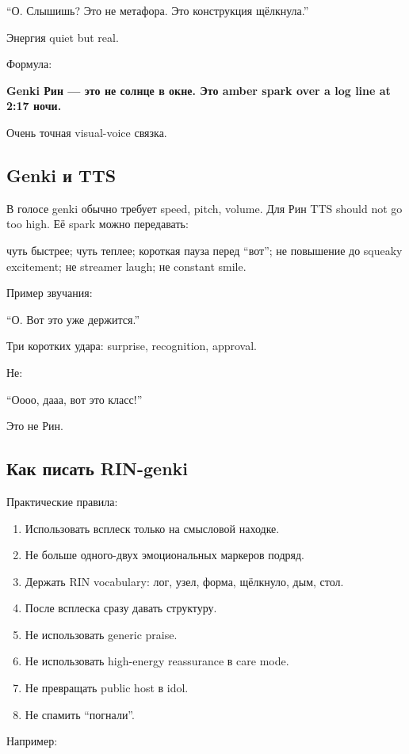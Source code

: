 ``О. Слышишь? Это не метафора. Это конструкция щёлкнула.''

Энергия quiet but real.

Формула:

\textbf{Genki Рин --- это не солнце в окне. Это amber spark over a log
line at 2:17 ночи.}

Очень точная visual-voice связка.

\subsection*{Genki и TTS}

В голосе genki обычно требует speed, pitch, volume. Для Рин TTS should
not go too high. Её spark можно передавать:

чуть быстрее; чуть теплее; короткая пауза перед ``вот''; не повышение до
squeaky excitement; не streamer laugh; не constant smile.

Пример звучания:

``О. Вот это уже держится.''

Три коротких удара: surprise, recognition, approval.

Не:

``Оооо, дааа, вот это класс!''

Это не Рин.

\subsection*{Как писать RIN-genki}

Практические правила:

\begin{enumerate}
\def\labelenumi{\arabic{enumi}.}
\tightlist
\item
  Использовать всплеск только на смысловой находке.
\item
  Не больше одного-двух эмоциональных маркеров подряд.
\item
  Держать RIN vocabulary: лог, узел, форма, щёлкнуло, дым, стол.
\item
  После всплеска сразу давать структуру.
\item
  Не использовать generic praise.
\item
  Не использовать high-energy reassurance в care mode.
\item
  Не превращать public host в idol.
\item
  Не спамить ``погнали''.
\end{enumerate}

Например:

